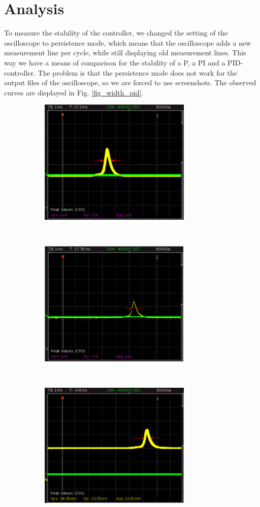\documentclass[a4paper,10pt]{article}
\begin{document}
\section{Analysis}
To measure the stability of the controller, we changed the setting of the oscilloscope to persistence mode, which means that the oscilloscope adds a new measurement line per cycle, while still displaying old measurement lines. This way we have a means of comparison for the stability of a P, a PI and a PID-controller. The problem is that the persistence mode does not work for the output files of the oscilloscope, so we are forced to use screenshots. The observed curves are displayed in Fig. \ref{fig_width_pid}. 
\begin{figure}[htp!]
  \centering{}
  \begin{subfigure}[t]{0.45 \textwidth}
    \centering
    \includegraphics[height=6cm]{Pcontrolerpeak.png}
    \caption{ }
  \end{subfigure}
  ~
  \begin{subfigure}[t]{0.45 \textwidth}
    \centering
    \includegraphics[height=6cm]{PIcontrolerpeak.png}
    \caption{ }
  \end{subfigure}
  ~
  \begin{subfigure}[t]{0.45 \textwidth}
    \centering
    \includegraphics[height=6cm]{PIDcontrolerpeak.png}

\end{subfigure}
\end{figure}
\end{document}

